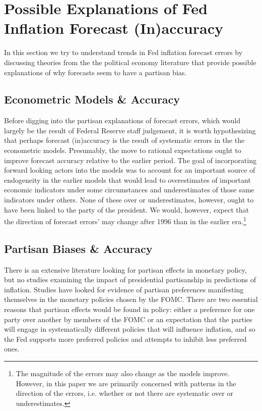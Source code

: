 \documentclass[a4paper]{article}\usepackage{graphicx, color}
\begin{document}
\section{Possible Explanations of Fed Inflation Forecast (In)accuracy}

In this section we try to understand trends in Fed inflation forecast errors by discussing theories from the the political economy literature that provide possible explanations of why forecasts seem to have a partisan bias. 

\subsection{Econometric Models \& Accuracy}

Before digging into the partisan explanations of forecast errors, which would largely be the result of Federal Reserve staff judgement, it is worth hypothesizing that perhaps forecast (in)accuracy is the result of systematic errors in the the econometric models. Presumably, the move to rational expectations ought to improve forecast accuracy relative to the earlier period. The goal of incorporating forward looking actors into the models was to account for an important source of endogeneity in the earlier models that would lead to overestimates of important economic indicators under some circumstances and underestimates of those same indicators under others. None of these over or underestimates, however, ought to have been linked to the party of the president. We would, however, expect that the direction of forecast errors' may change after 1996 than in the earlier era.\footnote{The magnitude of the errors may also change as the models improve. However, in this paper we are primarily concerned with patterns in the direction of the errors, i.e. whether or not there are systematic over or underestimates.}


\subsection{Partisan Biases \& Accuracy}

There is an extensive literature looking for partisan effects in monetary policy, but no studies examining the impact of presidential partisanship in predictions of inflation. Studies have looked for evidence of partisan preferences manifesting themselves in the monetary policies chosen by the FOMC. There are two essential reasons that partisan effects would be found in policy: either a preference for one party over another by members of the FOMC or an expectation that the parties will engage in systematically different policies that will influence inflation, and so the Fed supports more preferred policies and attempts to inhibit less preferred ones. 
\end{document}
